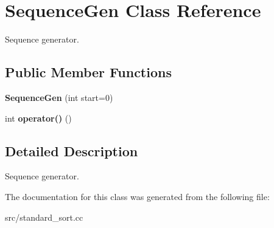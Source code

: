 \hypertarget{classSequenceGen}{
\section{SequenceGen Class Reference}
\label{d4/d99/classSequenceGen}
}


Sequence generator.  
\subsection*{Public Member Functions}
\begin{DoxyCompactItemize}
\item 
\hypertarget{classSequenceGen_a4d1ef90f7ec766284371caf9e6c4f791}{
{\bfseries SequenceGen} (int start=0)}
\label{d4/d99/classSequenceGen_a4d1ef90f7ec766284371caf9e6c4f791}

\item 
\hypertarget{classSequenceGen_af63e6e7ae3a2fdcb86a6ed263f953c84}{
int {\bfseries operator()} ()}
\label{d4/d99/classSequenceGen_af63e6e7ae3a2fdcb86a6ed263f953c84}

\end{DoxyCompactItemize}


\subsection{Detailed Description}
Sequence generator. 

The documentation for this class was generated from the following file:\begin{DoxyCompactItemize}
\item 
src/standard\_\-sort.cc\end{DoxyCompactItemize}

